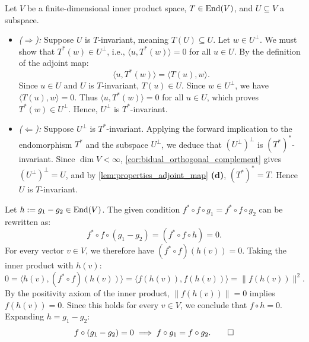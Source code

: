 \begin{exercisesolution}
\label{sol:invariant_subspaces_adjoint}
Let $V$ be a finite-dimensional inner product space, $T \in \operatorname{End}(V)$, and $U \subseteq V$ a subspace.
\begin{itemize}
    \item \emph{($\Rightarrow$):} Suppose $U$ is $T$-invariant, meaning $T(U) \subseteq U$.
    Let $w \in U^\perp$. We must show that $T^*(w) \in U^\perp$, i.e., $\langle u, T^*(w) \rangle = 0$ for all $u \in U$.
    By the definition of the adjoint map:
    \[
    \langle u, T^*(w) \rangle = \langle T(u), w \rangle.
    \]
    Since $u \in U$ and $U$ is $T$-invariant, $T(u) \in U$.
    Since $w \in U^\perp$, we have $\langle T(u), w \rangle = 0$.
    Thus $\langle u, T^*(w) \rangle = 0$ for all $u \in U$, which proves $T^*(w) \in U^\perp$. Hence, $U^\perp$ is $T^*$-invariant.

    \item \emph{($\Leftarrow$):} Suppose $U^\perp$ is $T^*$-invariant.
    Applying the forward implication to the endomorphism $T^*$ and the subspace $U^\perp$, we deduce that $(U^\perp)^\perp$ is $(T^*)^*$-invariant.
    Since $\dim V < \infty$, \cref{cor:bidual_orthogonal_complement} gives $(U^\perp)^\perp = U$, and by \cref{lem:properties_adjoint_map} \textbf{(d)}, $(T^*)^* = T$.
    Hence $U$ is $T$-invariant. \qedhere
\end{itemize}
\end{exercisesolution}

\begin{exercisesolution}
\label{sol:cancellation_adjoint_composite}
Let $h := g_1 - g_2 \in \operatorname{End}(V)$.
The given condition $f^* \circ f \circ g_1 = f^* \circ f \circ g_2$ can be rewritten as:
\[
f^* \circ f \circ (g_1 - g_2) = (f^* \circ f \circ h) = 0.
\]
For every vector $v \in V$, we therefore have $(f^* \circ f)(h(v)) = 0$.
Taking the inner product with $h(v)$:
\[
0 = \langle h(v), (f^* \circ f)(h(v)) \rangle = \langle f(h(v)), f(h(v)) \rangle = \|f(h(v))\|^2.
\]
By the positivity axiom of the inner product, $\|f(h(v))\| = 0$ implies $f(h(v)) = 0$.
Since this holds for every $v \in V$, we conclude that $f \circ h = 0$.
Expanding $h = g_1 - g_2$:
\[
f \circ (g_1 - g_2) = 0 \implies f \circ g_1 = f \circ g_2. \qedhere
\]
\end{exercisesolution}
